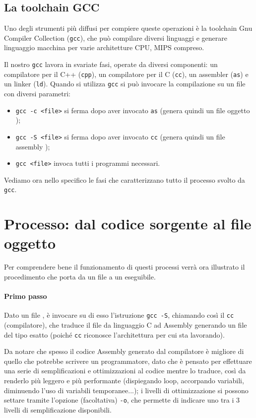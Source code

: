 \subsection*{La toolchain GCC}
Uno degli strumenti più diffusi per compiere queste operazioni è la toolchain Gnu Compiler Collection (\texttt{gcc}), che può compilare diversi linguaggi e generare linguaggio macchina per varie architetture CPU, MIPS compreso.

Il nostro \texttt{gcc} lavora in svariate fasi, operate da diversi componenti: un compilatore per il C++ (\texttt{cpp}), un compilatore per il C (\texttt{cc}), un assembler (\texttt{as}) e un linker (\texttt{ld}).
Quando si utilizza \texttt{gcc} si può invocare la compilazione su un file con diversi parametri:
\begin{itemize}
	\item \texttt{gcc -c <file>} si ferma dopo aver invocato \texttt{as} (genera quindi un file oggetto );
	\item \texttt{gcc -S <file>} si ferma dopo aver invocato \texttt{cc} (genera quindi un file assembly );
	\item \texttt{gcc <file>} invoca tutti i programmi necessari.
\end{itemize}
Vediamo ora nello specifico le fasi che caratterizzano tutto il processo svolto da \texttt{gcc}.

\section{Processo: dal codice sorgente al file oggetto}
Per comprendere bene il funzionamento di questi processi verrà ora illustrato il procedimento che porta da un file  a un eseguibile.

\paragraph*{Primo passo} Dato un file , è invocare su di esso l'istruzione \texttt{gcc -S}, chiamando così il \texttt{cc} (compilatore), che traduce il file da linguaggio C ad Assembly generando un file  del tipo esatto (poiché \texttt{cc} riconosce l'architettura per cui sta lavorando).

Da notare che spesso il codice Assembly generato dal compilatore è migliore di quello che potrebbe scrivere un programmatore, dato che è pensato per effettuare una serie di semplificazioni e ottimizzazioni al codice mentre lo traduce, così da renderlo più leggero e più performante (dispiegando loop, accorpando variabili, diminuendo l'uso di variabili temporanee...); i livelli di ottimizzazione si possono settare tramite l'opzione (facoltativa) \texttt{-o}, che permette di indicare uno tra i \(3\) livelli di semplificazione disponibili.

